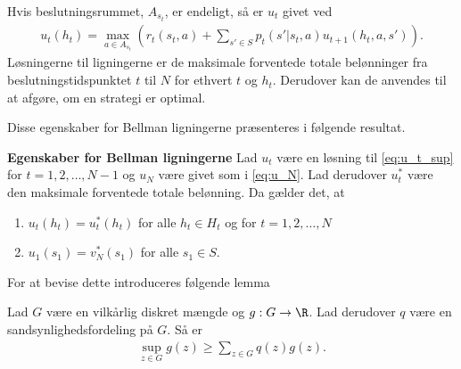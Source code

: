 Hvis beslutningsrummet, $A_{s_t}$, er endeligt, så er $u_t$ givet ved
\begin{align}\label{eq:u_t_max}
   u_t(h_t)=\max_{a\in A_{s_t}}\left(r_t(s_t, a)+\sum_{s'\in S}p_t(s'|s_t, a)u_{t+1}(h_t, a, s')\right).
\end{align}
Løsningerne til ligningerne er de maksimale forventede totale belønninger fra beslutningstidspunktet $t$ til $N$ for ethvert $t$ og $h_t$. Derudover kan de anvendes til at afgøre, om en strategi er optimal. 


Disse egenskaber for Bellman ligningerne præsenteres i følgende resultat.

\begin{minipage}\textwidth
\begin{thmx} \textbf{Egenskaber for Bellman ligningerne} \label{sæt:ret_så_vigtig}%
\newline
Lad $u_t$ være en løsning til \eqref{eq:u_t_sup} for $t = 1, 2, \ldots, N-1$ og $u_N$ være givet som i \eqref{eq:u_N}. Lad derudover $u_t^*$ være den maksimale forventede totale belønning. Da gælder det, at
\begin{enumerate}
    \item $u_t(h_t)=u_t^*(h_t)$ for alle $h_t\in H_t$ og for $t=1, 2,\ldots, N$
    \item $u_1(s_1)=v_N^*(s_1)$ for alle $s_1\in S$.
\end{enumerate}
\end{thmx}
\end{minipage}

For at bevise dette introduceres følgende lemma

\begin{minipage}\textwidth
\begin{lem} \label{lem:ret_vigtig}\textbf{} %
\newline
Lad $G$ være en vilkårlig diskret mængde og $g: G\to \R$. Lad derudover $q$ være en sandsynlighedsfordeling på $G$. Så er
\begin{align*}
    \sup_{z\in G}g(z)\geq \sum_{z\in G}q(z) g(z).
\end{align*}
\end{lem}
\end{minipage}

